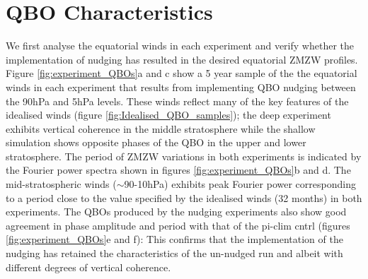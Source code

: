 \section{QBO Characteristics}
We first analyse the equatorial winds in each experiment and verify whether the implementation of nudging has resulted in the desired equatorial ZMZW profiles. Figure \ref{fig:experiment_QBOs}a and c show a 5 year sample of the the equatorial winds in each experiment that results from implementing QBO nudging between the 90hPa and 5hPa levels. These winds reflect many of the key features of the idealised winds (figure \ref{fig:Idealised_QBO_samples}); the deep experiment exhibits vertical coherence in the middle stratosphere while the shallow simulation shows opposite phases of the QBO in the upper and lower stratosphere. The period of ZMZW variations in both experiments is indicated by the Fourier power spectra shown in figures \ref{fig:experiment_QBOs}b and d. The mid-stratospheric winds ($\sim$90-10hPa) exhibits peak Fourier power corresponding to a period close to the value specified by the idealised winds (32 months) in both experiments. The QBOs produced by the nudging experiments also show good agreement in phase amplitude and period with that of the pi-clim cntrl (figures \ref{fig:experiment_QBOs}e and f): This confirms that the implementation of the nudging has retained the characteristics of the un-nudged run and albeit with different degrees of vertical coherence.

